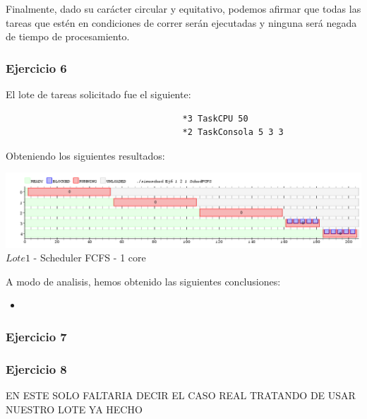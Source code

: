 \indent Finalmente, dado su carácter circular y equitativo, podemos afirmar que todas las tareas que 
estén en condiciones de correr serán ejecutadas y ninguna será negada de tiempo de procesamiento.\\


\subsubsection[Resolución Ejercicio 5]{Ejercicio 6}

El lote de tareas solicitado fue el siguiente:
\begin{verbatim}
                                   *3 TaskCPU 50
                                   *2 TaskConsola 5 3 3
\end{verbatim}

Obteniendo los siguientes resultados:

\begin{center}
  	\includegraphics[width=450pt]{./Test/ej6.png}
	  {$Lote 1$ - Scheduler FCFS - 1 core}	
\end{center}

\indent A modo de analisis, hemos obtenido las siguientes conclusiones:\\

\begin{itemize}
 \item 
\end{itemize}


\subsubsection[Resolución Ejercicio 5]{Ejercicio 7}

\subsubsection[Resolución Ejercicio 8]{Ejercicio 8}

EN ESTE SOLO FALTARIA DECIR EL CASO REAL TRATANDO DE USAR NUESTRO LOTE YA HECHO

